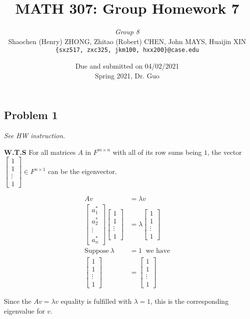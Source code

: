 \documentclass[11pt]{article}
\newcommand{\ilc}{\texttt}
\providecommand{\qbm}[1]{\begin{bmatrix} #1 \end{bmatrix}}
\begin{document}
\title{\textbf{MATH 307: Group Homework 7}}


\author{\textit{Group 8}\\
Shaochen (Henry) ZHONG, Zhitao (Robert) CHEN, John MAYS, Huaijin XIN\\ \ilc{\{sxz517, zxc325, jkm100, hxx200\}@case.edu}}

\date{Due and submitted on 04/02/2021 \\ Spring 2021, Dr. Guo}
\maketitle




\subsection*{Problem 1}
\textit{See HW instruction.}\newline

\textbf{W.T.S} For all matrices $A$ in $F^{m \times n}$ with all of its row sums being $1$, the vector $\qbm{1 \\ 1\\ \vdots \\ 1} \in F^{n \times 1}$ can be the eigenvector.

\begin{align*}
    Av &= \lambda v \\
    \qbm{a^*_1 \\ a^*_2 \\ \vdots \\ a^*_n} \qbm{1 \\ 1 \\ \vdots \\ 1} &= \lambda  \qbm{1 \\ 1 \\ \vdots \\ 1} \\
    \text{Suppose} \ \lambda &= 1 \ \text{ we have} \\
    \qbm{1 \\ 1 \\ \vdots \\ 1} &=  \qbm{1 \\ 1 \\ \vdots \\ 1}
\end{align*}

Since the $Av = \lambda v$ equality is fulfilled with $\lambda = 1$, this is the corresponding eigenvalue for $v$.
\end{document}
